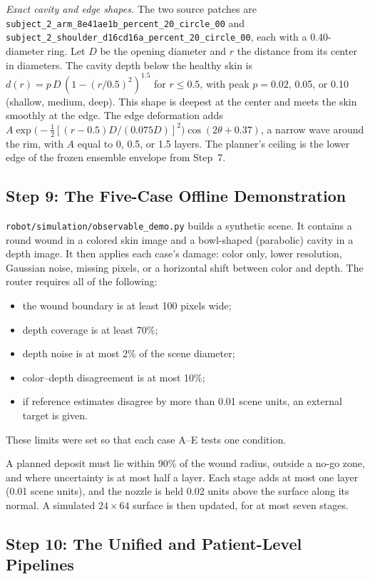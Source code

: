 \documentclass[conference]{IEEEtran}
\begin{document}
\emph{Exact cavity and edge shapes.} The two source patches are
\texttt{subject\_2\_arm\_8e41ae1b\_percent\_20\_circle\_00} and
\texttt{subject\_2\_shoulder\_d16cd16a\_percent\_20\_circle\_00}, each with
a 0.40-diameter ring. Let $D$ be the opening diameter and $r$ the distance
from its center in diameters. The cavity depth below the healthy skin is
$d(r) = p\,D\,(1-(r/0.5)^2)^{1.5}$ for $r\le0.5$, with peak $p=0.02$,
0.05, or 0.10 (shallow, medium, deep). This shape is deepest at the center
and meets the skin smoothly at the edge. The edge deformation adds
$A\exp\!\big(-\tfrac12[(r-0.5)D/(0.075D)]^2\big)\cos(2\theta+0.37)$, a
narrow wave around the rim, with $A$ equal to 0, 0.5, or 1.5 layers. The
planner's ceiling is the lower edge of the frozen ensemble envelope from
Step~7.

\subsection{Step 9: The Five-Case Offline Demonstration}

\texttt{robot/simulation/observable\_demo.py} builds a synthetic scene. It
contains a round wound in a colored skin image and a bowl-shaped
(parabolic) cavity in a depth image. It then applies each case's
damage: color only, lower resolution, Gaussian noise, missing pixels, or a
horizontal shift between color and depth. The router requires all of the
following:
\begin{itemize}
\item the wound boundary is at least 100 pixels wide;
\item depth coverage is at least 70\%;
\item depth noise is at most 2\% of the scene diameter;
\item color--depth disagreement is at most 10\%;
\item if reference estimates disagree by more than 0.01 scene units, an
external target is given.
\end{itemize}
These limits were set so that each case A--E tests one condition.

A planned deposit must lie within 90\% of the wound radius, outside a
no-go zone, and where uncertainty is at most half a layer. Each stage adds
at most one layer (0.01 scene units), and the nozzle is held 0.02 units
above the surface along its normal. A simulated $24\times64$ surface is then
updated, for at most seven stages.

\subsection{Step 10: The Unified and Patient-Level Pipelines}
\end{document}
